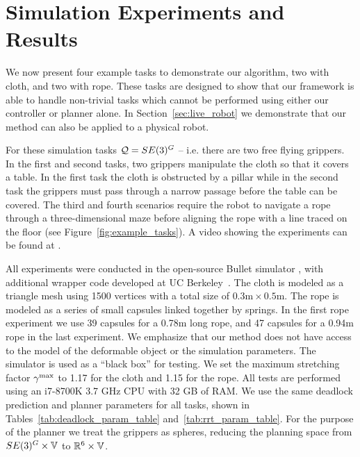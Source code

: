 \section{Simulation Experiments and Results}
\label{sec:simulation_experiments}

We now present four example tasks to demonstrate our algorithm, two with cloth, and two with rope. These tasks are designed to show that our framework is able to handle non-trivial tasks which cannot be performed using either our controller or planner alone. In Section~\ref{sec:live_robot} we demonstrate that our method can also be applied to a physical robot.

For these simulation tasks $\mathcal{Q} = SE(3)^G$ -- i.e. there are two free flying grippers. In the first and second tasks, two grippers manipulate the cloth so that it covers a table. In the first task the cloth is obstructed by a pillar while in the second task the grippers must pass through a narrow passage before the table can be covered. The third and fourth scenarios require the robot to navigate a rope through a three-dimensional maze before aligning the rope with a line traced on the floor (see Figure~\ref{fig:example_tasks}). A video showing the experiments can be found at \ijrrurl.

All experiments were conducted in the open-source Bullet simulator \cite{Coumans2010}, with additional wrapper code developed at UC Berkeley~\cite{ucberkley_bullet}. The cloth is modeled as a triangle mesh using 1500 vertices with a total size of $0.3\text{m} \times 0.5\text{m}$. The rope is modeled as a series of small capsules linked together by springs. In the first rope experiment we use 39 capsules for a 0.78m long rope, and 47 capsules for a 0.94m rope in the last experiment. We emphasize that our method does not have access to the model of the deformable object or the simulation parameters. The simulator is used as a ``black box'' for testing. We set the maximum stretching factor $\gamma^{\textrm{max}}$ to 1.17 for the cloth and 1.15 for the rope. All tests are performed using an i7-8700K 3.7 GHz CPU with 32 GB of RAM. We use the same deadlock prediction and planner parameters for all tasks, shown in Tables~\ref{tab:deadlock_param_table} and~\ref{tab:rrt_param_table}. For the purpose of the planner we treat the grippers as spheres, reducing the planning space from $SE(3)^G \times \mathbb{V}$ to $\mathbb{R}^6 \times \mathbb{V}$.

